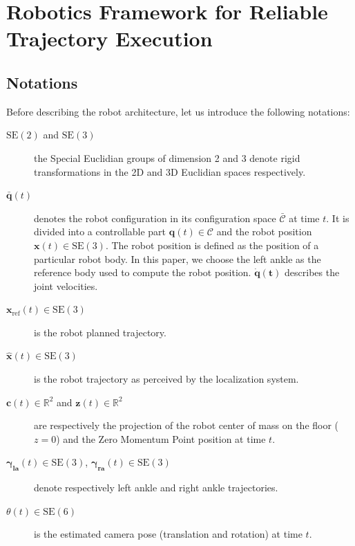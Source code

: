\section{Robotics Framework for Reliable Trajectory Execution}\label{sec:architecture}

\subsection{Notations}
Before describing the robot architecture, let us introduce the following notations:

\begin{description}
\item[$\text{SE}(2)$ and $\text{SE}(3)$]\hspace{1.45cm} the Special Euclidian groups of dimension 2 and 3 denote rigid transformations in the 2D and 3D Euclidian spaces respectively.
\item[$\mathbf{\bar{q}}(t)$] denotes the robot configuration in its configuration space $\mathcal{\bar{C}}$ at time $t$. It is divided into a controllable part $\mathbf{q}(t) \in \mathcal{C}$ and the robot position $\mathbf{x}(t) \in \text{SE}(3)$. The robot position is defined as the position of a particular robot body. In this paper, we choose the left ankle as the reference body used to compute the robot position. $\mathbf{\dot{q}(t)}$ describes the joint velocities.
\item[$\mathbf{x}_{\text{ref}}(t) \in \text{SE}(3)$] \hspace{1.2cm} is the robot planned trajectory.
\item[$\mathbf{\hat{x}}(t) \in \text{SE}(3)$] \hspace{.8cm} is the robot trajectory as perceived by the localization system.
\item[$\mathbf{c}(t) \in \mathbb{R}^2$ and $\mathbf{z}(t) \in
  \mathbb{R}^2$]\hspace{2.6cm} are respectively the projection of the robot center of mass on the floor ($z = 0$) and the Zero Momentum Point position at time $t$.
\item[$\mathbf{\gamma_{\text{la}}}(t) \in \text{SE}(3)$, $\mathbf{\gamma_{\text{ra}}}(t)
  \in \text{SE}(3)$]\hspace{3.4cm} denote respectively left ankle and right ankle trajectories.
\item[$\theta(t) \in \text{SE}(6)$]\hspace{0.8cm} is the estimated camera pose (translation and rotation) at time $t$.
\end{description}

